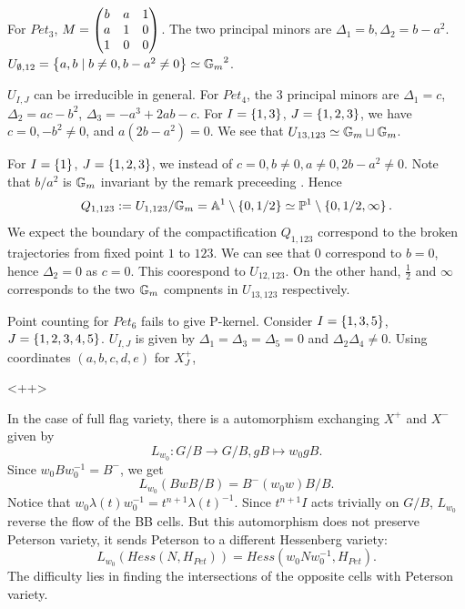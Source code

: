 \begin{example}[exp:]{}
  For $Pet_3$, $M=\begin{pmatrix}b&a&1\\a&1&0\\1&0&0\end{pmatrix}$. The two principal minors are $\Delta_1=b,\Delta_2=b-a^2$. $U_{\emptyset ,12}=\left\{a,b\mid b\neq 0,b-a^2\neq 0\right\}\simeq {\mathbb{G}_m}^2$. 

  $U_{I,J}$ can be irreducible in general.
  For $Pet_4$, the 3 principal minors are $\Delta_1=c$, $\Delta_2=ac-b^2$, $\Delta_3=-a^3+2ab-c$. For $I=\left\{1,3\right\}$, $J=\left\{1,2,3\right\}$, we have $c=0, -b^2\neq 0$, and $a(2b-a^2)=0$. We see that $U_{13,123}\simeq {\mathbb{G}_m}\sqcup {\mathbb{G}_m}$.

  For $I=\left\{1\right\}$, $J=\left\{1,2,3\right\}$, we instead of $c=0,b\neq 0,a\neq 0,2b-a^2\neq 0$. Note that $b/a^2$ is ${\mathbb{G}_m}$ invariant by the remark preceeding . Hence 
  \[
    Q_{1,123}:=U_{1,123}/{\mathbb{G}_m}=\mathbb{A}^1\setminus \left\{0,1/2\right\}\simeq \mathbb{P}^1\setminus \left\{0,1/2,\infty \right\}.
  \]
  We expect the boundary of the compactification $Q_{1,123}$ correspond to the broken trajectories from fixed point $1$ to $123$.
  We can see that $0$ correspond to $b=0$, hence $\Delta_2=0$ as $c=0$. This coorespond to $U_{12,123}$.
  On the other hand, $\frac{1}{2}$ and $\infty $ corresponds to the two ${\mathbb{G}_m}$ compnents in $U_{13,123}$ respectively.
\end{example}

\begin{example}[exp:]{}
  Point counting for $Pet_6$ fails to give P-kernel. Consider $I=\left\{1,3,5\right\}$, $J=\left\{1,2,3,4,5\right\}$. $U_{I,J}$ is given by $\Delta_1=\Delta_3=\Delta_5=0$ and $\Delta_2\Delta_4\neq 0$. Using coordinates $(a,b,c,d,e)$ for $X_J^+$, 
\end{example}

<++>

\begin{remark}
  In the case of full flag variety, there is a automorphism exchanging $X^+$ and $X^-$ given by
  \[
    L_{w_0}:G/B\rightarrow G/B, gB\mapsto w_0gB.
  \]
  Since $w_0Bw_0^{-1}=B^-$, we get
  \[
    L_{w_0}(BwB/B)=B^-(w_0w)B/B.
  \]
  Notice that $w_0\lambda(t)w_0^{-1}=t^{n+1}\lambda(t)^{-1}$. Since $t^{n+1}I$ acts trivially on $G/B$, $L_{w_0}$ reverse the flow of the BB cells.
  But this automorphism does not preserve Peterson variety, it sends Peterson to a different Hessenberg variety:
  \[
    L_{w_0}(Hess(N,H_{Pet}))=Hess(w_0Nw_0^{-1},H_{Pet}).
  \]
  The difficulty lies in finding the intersections of the opposite cells with Peterson variety.
\end{remark}
